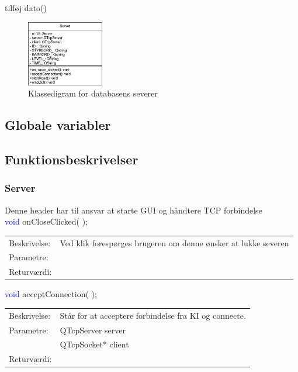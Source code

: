 tilføj dato()
\begin{figure}[htbp]
	\centering
	\includegraphics[width=0.3\textwidth]{billeder/serverKlassediagram}
	\caption{Klassedigram for databasens severer}
	\label{fig:serverKlassediagram}
\end{figure}

\subsection{Globale variabler}


\subsection{Funktionsbeskrivelser}
\subsubsection{Server}
Denne header har til ansvar at starte GUI og håndtere TCP forbindelse\\

\textcolor{blue}{void} onCloseClicked( \textcolor{blue}{} );
\begin{table}[H]
\begin{tabular}{l p{12.5cm}}
\hline
Beskrivelse:&Ved klik forespørges brugeren om denne ønsker at lukke severen\\
Parametre:&\\
Returværdi:&\\
\end{tabular}
\end{table}

\textcolor{blue}{void} acceptConnection( \textcolor{blue}{} );
\begin{table}[H]
\begin{tabular}{l p{12.5cm}}
\hline
Beskrivelse:&Står for at acceptere forbindelse fra KI og connecte.\\
Parametre:&QTcpServer server\\
				&QTcpSocket* client\\
Returværdi:&\\
\end{tabular}
\end{table}

